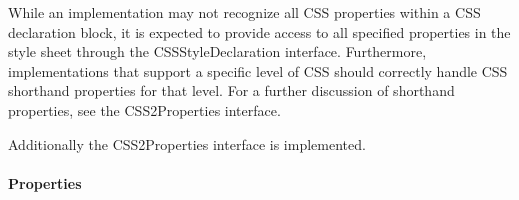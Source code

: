 While an implementation may not recognize all CSS properties within
a CSS declaration block, it is expected to provide access to all
specified properties in the style sheet through the
CSSStyleDeclaration interface.
Furthermore, implementations that support a specific level of CSS
should correctly handle CSS shorthand properties for that level. For
a further discussion of shorthand properties, see the CSS2Properties
interface.

Additionally the CSS2Properties interface is implemented.



\hypertarget{properties}{}
\paragraph*{Properties}
\label{properties}
